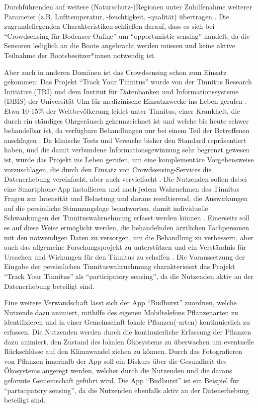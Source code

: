 Durchführenden auf weitere (Naturschutz-)Regionen unter Zuhilfenahme weiterer Parameter (z.B. Lufttemperatur, -feuchtigkeit, -qualität) übertragen \cite{Bodensee2021}. Die zugrundeliegenden Charakteristiken schließen darauf, dass es sich bei \enquote{Crowdsensing für Bodensee Online} um \enquote{opportunistic sensing} handelt, da die Sensoren lediglich an die Boote angebracht werden müssen und keine aktive Teilnahme der Bootsbesitzer*innen notwendig ist. 

Aber auch in anderen Domänen ist das Crowdsensing schon zum Einsatz gekommen: Das Projekt \enquote{Track Your Tinnitus} wurde von der Tinnitus Research Initiative (TRI) und dem Institut für Datenbanken und Informationssysteme (DBIS) der Universität Ulm für medizinische Einsatzzwecke ins Leben gerufen \cite{Pryss2017}. Etwa 10-15\% der Weltbevölkerung leidet unter Tinnitus, einer Krankheit, die durch ein ständiges Ohrgeräusch gekennzeichnet ist und welche bis heute schwer behandelbar ist, da verfügbare Behandlungen nur bei einem Teil der Betroffenen anschlagen \cite{langguth2011review}. Da klinische Tests und Versuche bisher den Standard repräsentiert haben, und die damit verbundene Informationsgewinnung sehr begrenzt gewesen ist, wurde das Projekt ins Leben gerufen, um eine komplementäre Vorgehensweise vorzuschlagen, die durch den Einsatz von Crowdsensing-Services die Datenerhebung vereinfacht, aber auch vervielfacht \cite{pryss2015mobile}. Die Nutzenden sollen dabei eine Smartphone-App installieren und nach jedem Wahrnehmen des Tinnitus Fragen zur Intensität und Belastung und daraus resultierend, die Auswirkungen auf die persönliche Stimmungslage beantworten, damit individuelle Schwankungen der Tinnituswahrnehmung erfasst werden können \cite{pryss2015mobile}. Einerseits soll es auf diese Weise ermöglicht werden, die behandelnden ärztlichen Fachpersonen mit den notwendigen Daten zu versorgen, um die Behandlung zu verbessern, aber auch das allgemeine Forschungsprojekt zu unterstützen und ein Verständnis für Ursachen und Wirkungen für den Tinnitus zu schaffen \cite{pryss2015mobile}. Die Voraussetzung der Eingabe der persönlichen Tinnituswahrnehmung charakterisiert das Projekt \enquote{Track Your Tinnitus} als \enquote{participatory sensing}, da die Nutzenden aktiv an der Datenerhebung beteiligt sind.

Eine weitere Verwandschaft lässt sich der App \enquote{Budburst} zuordnen, welche Nutzende dazu animiert, mithilfe des eigenen Mobiltelefons Pflanzenarten zu identifizieren und in einer Gemeinschaft lokale Pflanzen(-arten) kontinuierlich zu erfassen. Die Nutzenden werden durch die kontinuierliche Erfassung der Pflanzen dazu animiert, den Zustand des lokalen Ökosystems zu überwachen um eventuelle Rückschlüsse auf den Klimawandel ziehen zu können. Durch das Fotografieren von Pflanzen innerhalb der App soll ein Diskurs über die Gesundheit des Ökosystems angeregt werden, welcher durch die Nutzenden und die daraus geformte Gemeinschaft geführt wird. Die App \enquote{Budburst} ist ein Beispiel für \enquote{participatory sensing}, da die Nutzenden ebenfalls aktiv an der Datenerhebung beteiligt sind.

